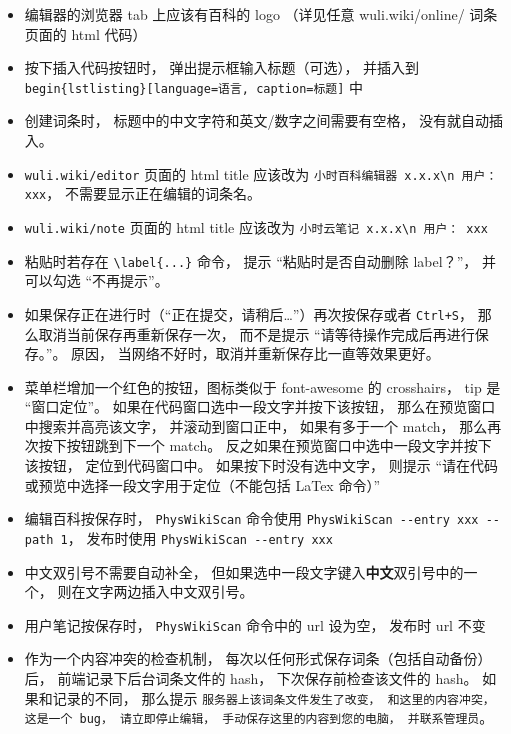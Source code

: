 \begin{itemize}
\item 编辑器的浏览器 tab 上应该有百科的 logo （详见任意 wuli.wiki/online/ 词条页面的 html 代码）

\item 按下插入代码按钮时， 弹出提示框输入标题（可选）， 并插入到 \verb|begin{lstlisting}[language=语言, caption=标题]| 中

\item 创建词条时， 标题中的中文字符和英文/数字之间需要有空格， 没有就自动插入。

\item \verb|wuli.wiki/editor| 页面的 html title 应该改为 \verb|小时百科编辑器 x.x.x\n 用户： xxx|， 不需要显示正在编辑的词条名。

\item \verb|wuli.wiki/note| 页面的 html title 应该改为 \verb|小时云笔记 x.x.x\n 用户： xxx|

\item 粘贴时若存在 \verb|\label{...}| 命令， 提示 “粘贴时是否自动删除 label？”， 并可以勾选 “不再提示”。

\item 如果保存正在进行时（“正在提交，请稍后…”）再次按保存或者 \verb|Ctrl+S|， 那么取消当前保存再重新保存一次， 而不是提示 “请等待操作完成后再进行保存。”。 原因， 当网络不好时，取消并重新保存比一直等效果更好。

\item 菜单栏增加一个红色的按钮，图标类似于 font-awesome 的 crosshairs， tip 是 “窗口定位”。 如果在代码窗口选中一段文字并按下该按钮， 那么在预览窗口中搜索并高亮该文字， 并滚动到窗口正中， 如果有多于一个 match， 那么再次按下按钮跳到下一个 match。 反之如果在预览窗口中选中一段文字并按下该按钮， 定位到代码窗口中。 如果按下时没有选中文字， 则提示 “请在代码或预览中选择一段文字用于定位（不能包括 LaTex 命令）”

\item 编辑百科按保存时， \verb|PhysWikiScan| 命令使用 \verb|PhysWikiScan --entry xxx --path 1|， 发布时使用 \verb|PhysWikiScan --entry xxx|

\item 中文双引号不需要自动补全， 但如果选中一段文字键入\textbf{中文}双引号中的一个， 则在文字两边插入中文双引号。

\item 用户笔记按保存时， \verb|PhysWikiScan| 命令中的 url 设为空， 发布时 url 不变

\item 作为一个内容冲突的检查机制， 每次以任何形式保存词条（包括自动备份）后， 前端记录下后台词条文件的 hash， 下次保存前检查该文件的 hash。 如果和记录的不同， 那么提示 \verb|服务器上该词条文件发生了改变， 和这里的内容冲突， 这是一个 bug， 请立即停止编辑， 手动保存这里的内容到您的电脑， 并联系管理员|。


\end{itemize}
